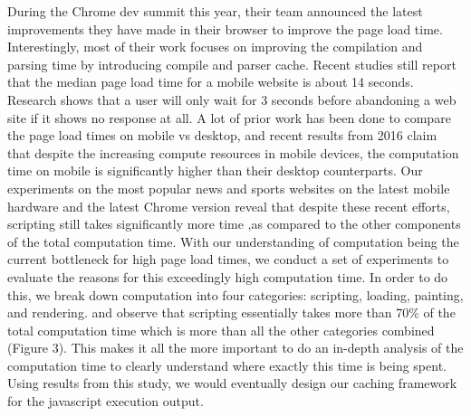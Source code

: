 During the Chrome dev summit this year, their team announced the latest improvements they have 
made in their browser to improve the page load time. Interestingly, most of their work focuses on
improving the compilation and parsing time by introducing compile and parser cache. 
Recent studies \cite{url4} still report that the median page load time for a mobile website 
is about 14 seconds. Research \cite{url4} shows that a user will only wait for 3 seconds 
before abandoning a web site if it shows no response at all. A lot of prior work \cite {njait2016www}
has been done to compare the page load times on mobile vs desktop, and recent results
from 2016 claim that despite the increasing compute resources in mobile devices,
the computation time on mobile is significantly higher than their desktop counterparts. 
 Our experiments
on the most popular news and sports websites on the latest mobile hardware and the latest 
Chrome version reveal that despite these recent efforts, scripting still takes significantly more
time ,as compared to the other components of the total computation time. With our understanding of 
computation being the current bottleneck for high page load times, 
we conduct a set of experiments to evaluate the reasons for this
exceedingly high computation time. In order to do this, we break down computation
into four categories: scripting, loading, painting, and rendering.
and observe that scripting essentially takes more than 70\% of the total
computation time which is more than all the other categories combined (Figure 3). 
This makes it all the more important to do an in-depth analysis of the computation time to clearly
understand where exactly this time is being spent. Using results from this study, we would eventually
design our caching framework for the javascript execution output. 
